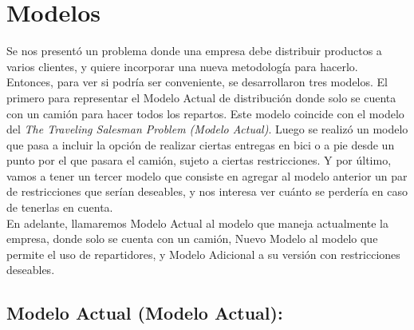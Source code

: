 \documentclass{article}
\begin{document}


    \maketitle

    \newpage

    \section{Modelos}
    Se nos presentó un problema donde una empresa debe distribuir productos a varios clientes, y quiere incorporar una nueva metodología para hacerlo. Entonces, para ver si podría ser conveniente, se desarrollaron tres modelos. El primero para representar el Modelo Actual de distribución donde solo se cuenta con un camión para hacer todos los repartos. Este modelo coincide con el modelo del \textit{The Traveling Salesman Problem (Modelo Actual)}. Luego se realizó un modelo que pasa a incluir la opción de realizar ciertas entregas en bici o a pie desde un punto por el que pasara el camión, sujeto a ciertas restricciones. Y por último, vamos a tener un tercer modelo que consiste en agregar al modelo anterior un par de restricciones que serían deseables, y nos interesa ver cuánto se perdería en caso de tenerlas en cuenta. \\
    En adelante, llamaremos Modelo Actual al modelo que maneja actualmente la empresa, donde solo se cuenta con un camión, Nuevo Modelo al modelo que permite el uso de repartidores, y Modelo Adicional a su versión con restricciones deseables.

    \subsection{Modelo Actual (Modelo Actual):} \label{modelo_actual}
\end{document}
